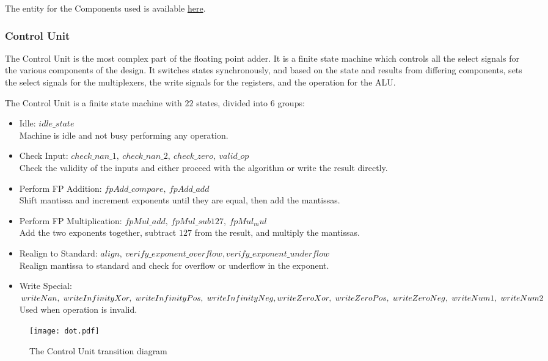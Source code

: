 \documentclass[a4paper,10pt]{article}
\begin{document}
    The entity for the Components used is available \hyperref[sec:components]{here}.

    \subsubsection{Control Unit}
    The Control Unit is the most complex part of the floating point adder. It is a finite state machine which controls all the select signals for the various components of the design. It switches states synchronously, and based on the state and results from differing components, sets the select signals for the multiplexers, the write signals for the registers, and the operation for the ALU.

    The Control Unit is a finite state machine with $22$ states, divided into $6$ groups:
    \begin{itemize}
      \item Idle: $idle\_state$\\
      Machine is idle and not busy performing any operation.
      \item Check Input: $check\_nan\_1,\ check\_nan\_2,\ check\_zero,\ valid\_op$\\
      Check the validity of the inputs and either proceed with the algorithm or write the result directly.
      \item Perform FP Addition: $fpAdd\_compare,\ fpAdd\_add$\\
      Shift mantissa and increment exponents until they are equal, then add the mantissas.
      \item Perform FP Multiplication: $fpMul\_add,\ fpMul\_sub127,\ fpMul_mul$\\
      Add the two exponents together, subtract $127$ from the result, and multiply the mantissas.
      \item Realign to Standard: $align,\ verify\_exponent\_overflow, verify\_exponent\_underflow$\\
      Realign mantissa to standard and check for overflow or underflow in the exponent.
      \item Write Special: $writeNan,\ writeInfinityXor,\ writeInfinityPos,\ writeInfinityNeg,\\ writeZeroXor,\ writeZeroPos,\ writeZeroNeg,\ writeNum1,\ writeNum2$\\
      Used when operation is invalid.
    \end{itemize}

    \begin{figure}[htbp]
    \centering
    \caption{The Control Unit transition diagram}
    \texttt{[image: dot.pdf]}
    \end{figure}
\end{document}
